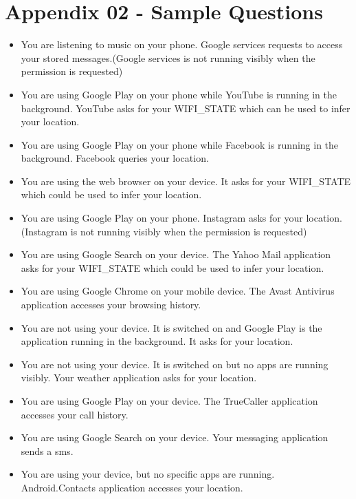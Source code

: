 \chapter*{Appendix 02 - Sample Questions}
\begin{itemize}
\item[] You are listening to music on your phone. Google services requests to access your stored messages.(Google services is not running visibly when the permission is requested)
\item[] You are using Google Play on your phone while YouTube is running in the background. YouTube asks for your WIFI\_STATE which can be used to infer your location. 
\item[] You are using Google Play on your phone while Facebook is running in the background. Facebook queries your location.
\item[] You are using the web browser on your device. It asks for your WIFI\_STATE which could be used to infer your location. 
\item[] You are using Google Play on your phone. Instagram asks for your location. (Instagram is not running visibly when the permission is requested) 
\item[] You are using Google Search on your device. The Yahoo Mail application asks for your WIFI\_STATE which could be used to infer your location. 
\item[] You are using Google Chrome on your mobile device. The Avast Antivirus application accesses your browsing history. 
\item[] You are not using your device. It is switched on and Google Play is the application running in the background. It asks for your location. 
\item[] You are not using your device. It is switched on but no apps are running visibly. Your weather application asks for your location.
\item[] You are using Google Play on your device. The TrueCaller application accesses your call history. 
\item[] You are using Google Search on your device. Your messaging application sends a sms.
\item[] You are using your device, but no specific apps are running. Android.Contacts application accesses your location. 
\end{itemize}




